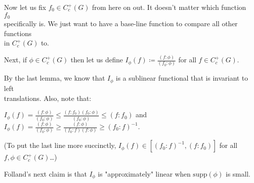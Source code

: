 \documentclass{book}
\newcommand{\hTwo}{%
\color{Black}%
   \fontsize{13}{15}\selectfont%
}
\newcommand{\hThree}{%
   \color{Black}%
   \fontsize{12}{14}\selectfont%
}
\newenvironment{myIndent}{%
   \begin{adjustwidth}{2.5em}{0em}%
}{%
   \end{adjustwidth}%
}
\newcommand{\supp}{\mathrm{supp}}
\newcommand{\retTwo}{\hfill\bigbreak}
\begin{document}
\hTwo Now let us fix $f_0 \in C_c^+(G)$ from here on out. It doesn't matter which function $f_0$\\ specifically is. We just want to have a base-line function to compare all other functions\\ in $C_c^+(G)$ to.\retTwo

Next, if $\phi \in C_c^{+}(G)$ then let us define $ I_\phi(f) \coloneqq \frac{(f : \phi)}{(f_0 : \phi)}$ for all $f \in C_c^{+}(G)$.

\begin{myIndent}\hThree
	By the last lemma, we know that $I_\phi$ is a sublinear functional that is invariant to left\\ translations. Also, note that:

	{\centering $I_\phi(f) = \frac{(f : \phi)}{(f_0 : \phi)} \leq \frac{(f : f_0)(f_0 : \phi)}{(f_0 : \phi)} \leq (f : f_0)$ and $I_\phi(f) = \frac{(f : \phi)}{(f_0 : \phi)} \geq \frac{(f : \phi)}{(f_0 : f)(f : \phi)} \geq (f_0 : f)^{-1}$.\retTwo\par}

	(To put the last line more succinctly, $I_\phi(f) \in [(f_0 : f)^{-1}, (f : f_0)]$ for all $f, \phi \in C_c^+(G)$\dots)\retTwo
\end{myIndent}

Folland's next claim is that $I_\phi$ is "approximately" linear when $\supp(\phi)$ is small.\retTwo
\end{document}
